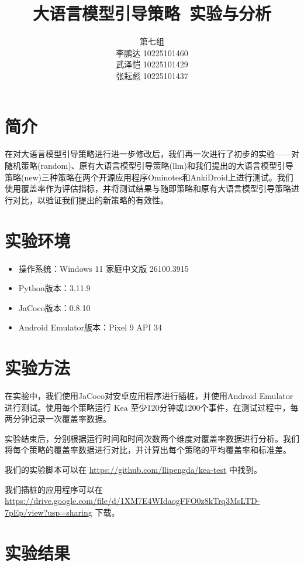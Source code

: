 \documentclass{article}
\title{\textbf{大语言模型引导策略\ 实验与分析}}
\author{第七组 \\ 
李鹏达 10225101460 \\[-1em]
武泽恺 10225101429 \\[-1em]
张耘彪 10225101437
}
\date{}
\begin{document}
\maketitle

\section{简介}

在对大语言模型引导策略进行进一步修改后，我们再一次进行了初步的实验——对随机策略(random)、原有大语言模型引导策略(llm)和我们提出的大语言模型引导策略(new)三种策略在两个开源应用程序Ominotes和AnkiDroid上进行测试。我们使用覆盖率作为评估指标，并将测试结果与随即策略和原有大语言模型引导策略进行对比，以验证我们提出的新策略的有效性。

\section{实验环境}

\begin{itemize}[noitemsep]
    \item 操作系统：Windows 11 家庭中文版 26100.3915
    \item Python版本：3.11.9
    \item JaCoco版本：0.8.10
    \item Android Emulator版本：Pixel 9 API 34
\end{itemize}

\section{实验方法}

在实验中，我们使用JaCoco对安卓应用程序进行插桩，并使用Android Emulator进行测试。使用每个策略运行 Kea 至少120分钟或1200个事件，在测试过程中，每两分钟记录一次覆盖率数据。

实验结束后，分别根据运行时间和时间次数两个维度对覆盖率数据进行分析。我们将每个策略的覆盖率数据进行对比，并计算出每个策略的平均覆盖率和标准差。

我们的实验脚本可以在 \url{https://github.com/llipengda/kea-test} 中找到。

我们插桩的应用程序可以在 \url{https://drive.google.com/file/d/1XM7E4WIdaogFFO0z8kTrq3MsLTD-7pEp/view?usp=sharing} 下载。

\section{实验结果}
\end{document}
